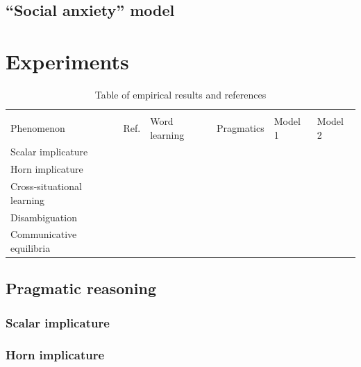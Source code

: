 \documentclass{article} %
\begin{document}
\subsection{``Social anxiety'' model}

\section{Experiments}

\begin{table}[t]
\caption{Table of empirical results and references}
\label{tab:results}
\begin{center}
\begin{tabular}{llllll}
\hline \\
Phenomenon & Ref. & Word learning \cite{frank2009} & Pragmatics \cite{frank2012,bergen2012}  & Model 1 & Model 2 \\
\hline
Scalar implicature & \cite{stiller2011} & & & & \\
Horn implicature & & & & & \\
Cross-situational learning & \cite{yu2007} & & & & \\
Disambiguation & \cite{markman1988} & & & & \\
Communicative equilibria & \cite{galantucci2007} & & & & \\
\end{tabular}
\end{center}
\end{table}

\subsection{Pragmatic reasoning}

\subsubsection{Scalar implicature}

%
%

\subsubsection{Horn implicature}
\end{document}
